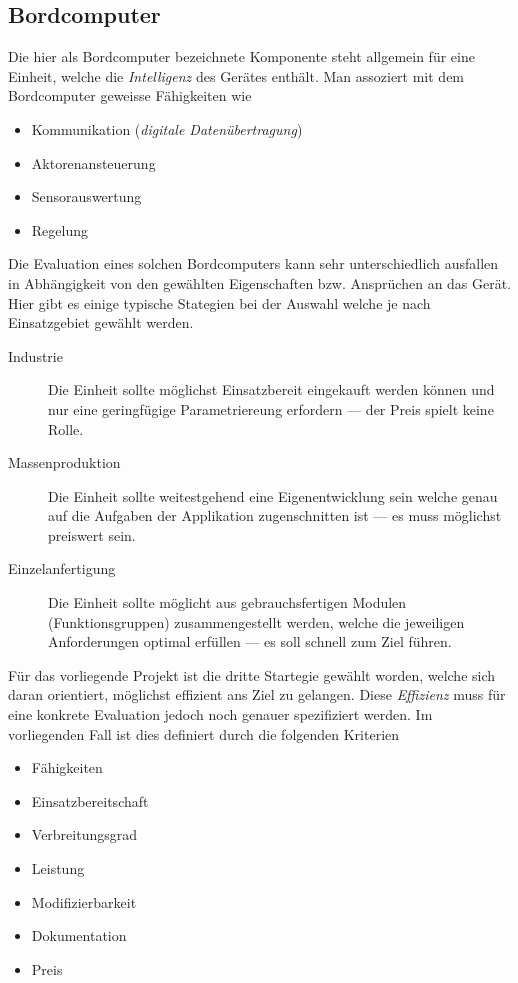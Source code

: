 \subsection{Bordcomputer}
Die hier als Bordcomputer bezeichnete Komponente steht allgemein für eine
Einheit, welche die \emph{Intelligenz} des Gerätes enthält. Man assoziert
mit dem Bordcomputer geweisse Fähigkeiten wie
\begin{itemize}
	\item Kommunikation (\emph{digitale Datenübertragung})
	\item Aktorenansteuerung
	\item Sensorauswertung
	\item Regelung
\end{itemize}

Die Evaluation eines solchen Bordcomputers kann sehr unterschiedlich 
ausfallen in Abhängigkeit von den gewählten Eigenschaften bzw. 
Ansprüchen an das Gerät. Hier gibt es einige typische Stategien bei der
Auswahl welche je nach Einsatzgebiet gewählt werden.
\begin{description}
	\item[Industrie] Die Einheit sollte möglichst Einsatzbereit
		eingekauft werden können und nur eine geringfügige
		Parametriereung erfordern --- der Preis spielt keine
		Rolle.
	\item[Massenproduktion] Die Einheit sollte weitestgehend eine
		Eigenentwicklung sein welche genau auf die Aufgaben
		der Applikation zugenschnitten ist --- es muss möglichst
		preiswert sein.
	\item[Einzelanfertigung] Die Einheit sollte möglicht aus 
		gebrauchsfertigen Modulen (Funktionsgruppen) 
		zusammengestellt werden, welche die jeweiligen 
		Anforderungen optimal erfüllen --- es soll schnell zum
		Ziel führen.
\end{description}

Für das vorliegende Projekt ist die dritte Startegie gewählt worden, 
welche sich daran orientiert, möglichst effizient ans Ziel zu gelangen.
Diese \emph{Effizienz} muss für eine konkrete Evaluation jedoch noch
genauer spezifiziert werden. Im vorliegenden Fall ist dies definiert
durch die folgenden Kriterien

\begin{itemize}
	\item Fähigkeiten
	\item Einsatzbereitschaft
	\item Verbreitungsgrad
	\item Leistung
	\item Modifizierbarkeit
	\item Dokumentation
	\item Preis
\end{itemize}

